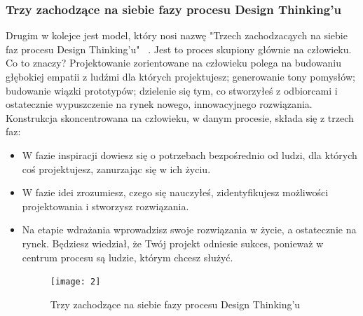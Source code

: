\documentclass[a4paper,titleauthor]{mwart}
\begin{document}
 \subsubsection{Trzy zachodzące na siebie fazy procesu Design Thinking'u}

Drugim w kolejce jest model, który nosi nazwę "Trzech zachodzacąych na siebie faz procesu Design Thinking'u" ~\cite{Proces2}. Jest to proces skupiony głównie na człowieku. \newline \newline 
Co to znaczy? \newline \newline
 Projektowanie zorientowane na człowieku polega na budowaniu głębokiej empatii z ludźmi dla których projektujesz; generowanie tony pomysłów; budowanie wiązki prototypów; dzielenie się tym, co stworzyłeś z odbiorcami i ostatecznie wypuszczenie na rynek nowego, innowacyjnego rozwiązania. \newline \newline
Konstrukcja skoncentrowana na człowieku, w danym procesie, składa się z trzech faz:\newline
 \begin{itemize}
 \item W fazie inspiracji dowiesz się o potrzebach bezpośrednio od ludzi, dla których coś projektujesz, zanurzając się w ich życiu. 
 \item W fazie idei zrozumiesz, czego się nauczyłeś, zidentyfikujesz możliwości projektowania i stworzysz rozwiązania. 
 \item Na etapie wdrażania wprowadzisz swoje rozwiązania w życie, a ostatecznie na rynek. Będziesz wiedział, że Twój projekt odniesie sukces, ponieważ w centrum procesu są ludzie, którym chcesz służyć. \newline 
 
 \newline
\begin{figure}[h]
 	\centering
 	\texttt{[image: 2]}
 	\caption{Trzy zachodzące na siebie fazy procesu Design Thinking'u}
 \end{figure}

\end{itemize}

 
\end{document}
